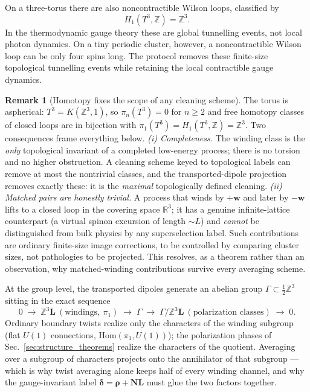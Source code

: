 \documentclass[11pt,letterpaper]{article}
\newcommand{\bN}{\bm N}
\newcommand{\bL}{\bm L}
\newcommand{\bw}{\bm w}
\newcommand{\brho}{\bm \rho}
\newcommand{\bdelta}{\bm \delta}
\newcommand{\Z}{\mathbb Z}
\theoremstyle{plain}
\theoremstyle{definition}
\newtheorem{remark}{Remark}
\begin{document}
On a three-torus there are also noncontractible Wilson loops, classified by
\[
H_1(T^3,\Z)=\Z^3.
\]
In the thermodynamic gauge theory these are global tunnelling events, not
local photon dynamics.  On a tiny periodic cluster, however, a noncontractible
Wilson loop can be only four spins long.  The protocol removes these
finite-size topological tunnelling events while retaining the local
contractible gauge dynamics.

\begin{remark}[Homotopy fixes the scope of any cleaning scheme]
\label{rem:homotopy_scope}
The torus is aspherical: $T^3=K(\Z^3,1)$, so $\pi_n(T^3)=0$ for $n\ge2$ and
free homotopy classes of closed loops are in bijection with
$\pi_1(T^3)=H_1(T^3,\Z)=\Z^3$.  Two consequences frame everything below.
\emph{(i) Completeness.}  The winding class is the \emph{only} topological
invariant of a completed low-energy process; there is no torsion and no
higher obstruction.  A cleaning scheme keyed to topological labels can remove
at most the nontrivial classes, and the transported-dipole projection removes
exactly these: it is the \emph{maximal} topologically defined cleaning.
\emph{(ii) Matched pairs are honestly trivial.}  A process that winds by
$+\bw$ and later by $-\bw$ lifts to a closed loop in the covering space
$\mathbb R^3$; it has a genuine infinite-lattice counterpart (a virtual
spinon excursion of length $\sim L$) and \emph{cannot} be distinguished from
bulk physics by any superselection label.  Such contributions are ordinary
finite-size image corrections, to be controlled by comparing cluster sizes,
not pathologies to be projected.  This resolves, as a theorem rather than an
observation, why matched-winding contributions survive every averaging
scheme.

At the group level, the transported dipoles generate an abelian group
$\Gamma\subset\tfrac12\Z^3$ sitting in the exact sequence
\[
0\;\to\;\Z^3\bL\ (\text{windings},\ \pi_1)\;\to\;\Gamma\;\to\;
\Gamma/\Z^3\bL\ (\text{polarization classes})\;\to\;0 .
\]
Ordinary boundary twists realize only the characters of the winding subgroup
(flat $U(1)$ connections, $\mathrm{Hom}(\pi_1,U(1))$); the polarization
phases of Sec.~\ref{sec:structure_theorems} realize the characters of the
quotient.  Averaging over a subgroup of characters projects onto the
annihilator of that subgroup --- which is why twist averaging alone keeps
half of every winding channel, and why the gauge-invariant label
$\bdelta=\brho+\bN\bL$ must glue the two factors together.
\end{remark}
\end{document}
